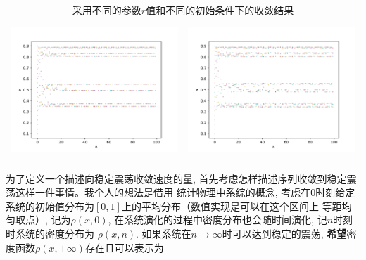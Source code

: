 \documentclass[a4paper,zihao=5,UTF8]{ctexart}
\begin{document}
\begin{table}[htbp]
\begin{tabular}[htbp]{cc}
            \includegraphics[scale=0.35]{5_8.pdf} & \includegraphics[scale=0.35]{5_16.pdf}\\
            \centering
        \end{tabular}
        \caption{采用不同的参数$r$值和不同的初始条件下的收敛结果}
    \end{table}
    \par 
    为了定义一个描述向稳定震荡收敛速度的量, 首先考虑怎样描述序列收敛到稳定震荡这样一件事情。我个人的想法是借用
    统计物理中系综的概念, 考虑在0时刻给定系统的初始值分布为$[0, 1]$上的平均分布（数值实现是可以在这个区间上
    等距均匀取点）, 记为$\rho(x, 0)$, 在系统演化的过程中密度分布也会随时间演化, 记$n$时刻时系统的密度分布为
    $\rho(x, n)$. 如果系统在$n\to\infty$时可以达到稳定的震荡, \textbf{希望}密度函数$\rho(x, +\infty)$存在且可以表示为
\end{document}
